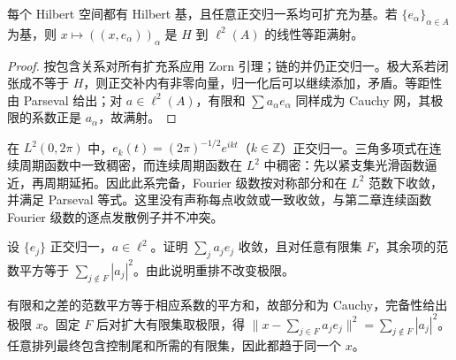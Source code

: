 \begin{proposition}
每个 Hilbert 空间都有 Hilbert 基，且任意正交归一系均可扩充为基。若 $\{e_\alpha\}_{\alpha\in A}$ 为基，则 $x\mapsto((x,e_\alpha))_\alpha$ 是 $H$ 到 $\ell^2(A)$ 的线性等距满射。
\end{proposition}
\begin{proof}
按包含关系对所有扩充系应用 Zorn 引理；链的并仍正交归一。极大系若闭张成不等于 $H$，则正交补内有非零向量，归一化后可以继续添加，矛盾。等距性由 Parseval 给出；对 $a\in\ell^2(A)$，有限和 $\sum a_\alpha e_\alpha$ 同样成为 Cauchy 网，其极限的系数正是 $a_\alpha$，故满射。
\end{proof}

\begin{example}
在 $L^2(0,2\pi)$ 中，$e_k(t)=(2\pi)^{-1/2}e^{ikt}$（$k\in\mathbb Z$）正交归一。三角多项式在连续周期函数中一致稠密，而连续周期函数在 $L^2$ 中稠密：先以紧支集光滑函数逼近，再周期延拓。因此此系完备，Fourier 级数按对称部分和在 $L^2$ 范数下收敛，并满足 Parseval 等式。这里没有声称每点收敛或一致收敛，与第二章连续函数 Fourier 级数的逐点发散例子并不冲突。
\end{example}

\begin{exercise}
设 $\{e_j\}$ 正交归一，$a\in\ell^2$。证明 $\sum_ja_je_j$ 收敛，且对任意有限集 $F$，其余项的范数平方等于 $\sum_{j\notin F}|a_j|^2$。由此说明重排不改变极限。
\end{exercise}
\begin{solution}
有限和之差的范数平方等于相应系数的平方和，故部分和为 Cauchy，完备性给出极限 $x$。固定 $F$ 后对扩大有限集取极限，得 $\|x-\sum_{j\in F}a_je_j\|^2=\sum_{j\notin F}|a_j|^2$。任意排列最终包含控制尾和所需的有限集，因此都趋于同一个 $x$。
\end{solution}
